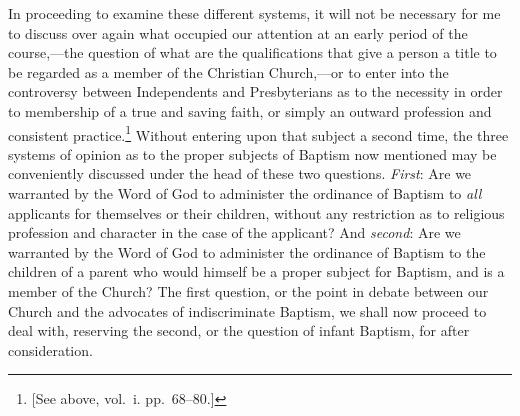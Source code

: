 \documentclass[
  english,
]{book}
\begin{document}
In proceeding to examine these different systems, it will not be necessary for me to discuss over again what occupied our attention at an early period of the course,---the question of what are the qualifications that give a person a title to be regarded as a member of the Christian Church,---or to enter into the controversy between Independents and Presbyterians as to the necessity in order to membership of a true and saving faith, or simply an outward profession and consistent practice.\footnote{{[}See above, vol.~i. pp.~68--80.{]}} Without entering upon that subject a second time, the three systems of opinion as to the proper subjects of Baptism now mentioned may be conveniently discussed under the head of these two questions. \emph{First}: Are we warranted by the Word of God to administer the ordinance of Baptism to \emph{all} applicants for themselves or their children, without any restriction as to religious profession and character in the case of the applicant? And \emph{second}: Are we warranted by the Word of God to administer the ordinance of Baptism to the children of a parent who would himself be a proper subject for Baptism, and is a member of the Church? The first question, or the point in debate between our Church and the advocates of indiscriminate Baptism, we shall now proceed to deal with, reserving the second, or the question of infant Baptism, for after consideration.
\end{document}
